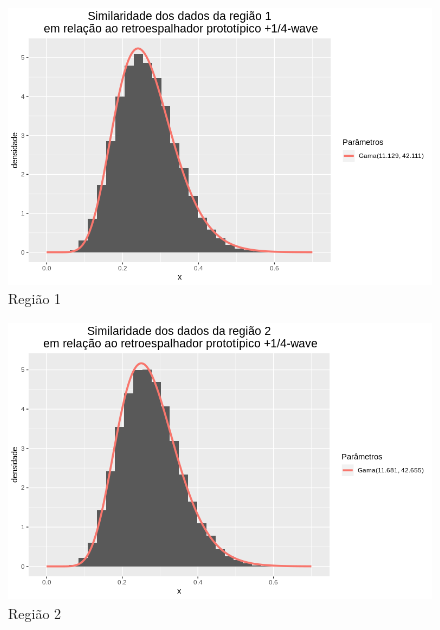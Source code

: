 \documentclass[12pt]{article}
\begin{document}
\begin{figure}[!h]
    \centering
    \vspace{0.05\linewidth}
    \includegraphics[width = \linewidth]{../../Images/Report_18_12_20/pwv_region1.png}
    \caption{Região 1}
    \label{fig:pwv_r1}
\end{figure}

\begin{figure}[!h]
    \centering
    \vspace{0.07\linewidth}
    \includegraphics[width = \linewidth]{../../Images/Report_18_12_20/pwv_region2.png}
    \caption{Região 2}
    \label{fig:pwv_r2}
\end{figure}
\end{document}
